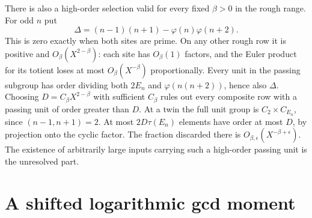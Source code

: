 \documentclass[11pt]{article}
\begin{document}
There is also a high-order selection valid for every fixed \(\beta>0\)
in the rough range. For odd \(n\) put
\[
   \Delta=(n-1)(n+1)-\varphi(n)\varphi(n+2).
\]
This is zero exactly when both sites are prime. On any other rough
row it is positive and \(O_\beta(X^{2-\beta})\): each site has
\(O_\beta(1)\) factors, and the Euler product for its totient loses at
most \(O_\beta(X^{-\beta})\) proportionally. Every unit in the
passing subgroup has order dividing both \(2E_n\) and
\(\varphi(n(n+2))\), hence also \(\Delta\). Choosing
\(D=C_\beta X^{2-\beta}\) with sufficient \(C_\beta\) rules out
every composite row with a passing unit of order greater than \(D\).
At a twin the full unit group is \(C_2\times C_{E_n}\), since
\((n-1,n+1)=2\). At most \(2D\tau(E_n)\) elements have order at most
\(D\), by projection onto the cyclic factor. The fraction discarded
there is \(O_{\beta,\epsilon}(X^{-\beta+\epsilon})\).
The existence of arbitrarily large inputs carrying such a
high-order passing unit is the unresolved part.

\section{A shifted logarithmic gcd moment}
\end{document}
